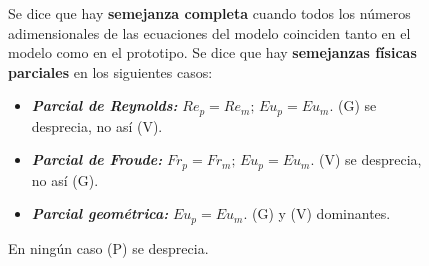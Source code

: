 \begin{figure}[H]
\begin{minipage}{0.6\textwidth}
				
				Se dice que hay \textbf{semejanza completa} cuando todos los números adimensionales de las ecuaciones del modelo coinciden tanto en el modelo como en el prototipo. Se dice que hay \textbf{semejanzas físicas parciales} en los siguientes casos:
				\begin{itemize}
					\item \textbf{\textit{Parcial de Reynolds:}} $Re_p = Re_m;\,Eu_p = Eu_m$. (G) se desprecia, no así (V).
					\item \textbf{\textit{Parcial de Froude:}} $Fr_p = Fr_m;\,Eu_p = Eu_m$. (V) se desprecia, no así (G).
					\item \textbf{\textit{Parcial geométrica:}} $Eu_p = Eu_m$. (G) y (V) dominantes.
				\end{itemize}
				
				En ningún caso (P) se desprecia.
			\end{minipage}
		\end{figure}